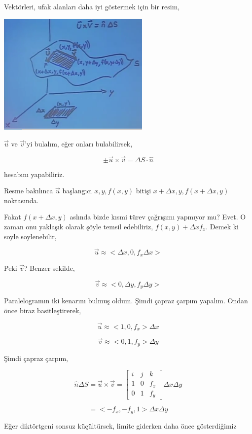 \documentclass[12pt,fleqn]{article}\usepackage{../../common}
\begin{document}
Vektörleri, ufak alanları daha iyi göstermek için bir resim,

\includegraphics[width=20em]{calc_multi_28_03.png}

$\vec{u}$ ve $\vec{v}$'yi bulalım, eğer onları bulabilirsek,

$$
\pm \vec{u} \times \vec{v} = \Delta S \cdot \hat{n}
$$

hesabını yapabiliriz.

Resme bakılınca $\vec{u}$ başlangıcı $x,y,f(x,y)$ bitişi $x+\Delta
x,y,f(x+\Delta x,y)$ noktasında.

Fakat $f(x+\Delta x,y)$ aslında bizde kısmi türev çağrışımı yapmıyor mu?
Evet. O zaman onu yaklaşık olarak şöyle temsil edebiliriz,
$f(x,y) + \Delta x f_x$. Demek ki soyle soylenebilir,

$$
\vec{u} \approx < \Delta x, 0, f_x \Delta x >
$$

Peki $\vec{v}$? Benzer sekilde,

$$
\vec{v} \approx < 0, \Delta y, f_y \Delta y >
$$

Paralelogramın iki kenarını bulmuş oldum. Şimdi çapraz çarpım yapalım. Ondan
önce biraz basitleştirerek,

$$
\vec{u} \approx < 1, 0, f_x  > \Delta x
$$

$$
\vec{v} \approx < 0, 1, f_y  > \Delta y
$$

Şimdi çapraz çarpım,

$$
\hat{n} \Delta S =
\vec{u} \times \vec{v} =
\left[\begin{array}{ccc}
i & j & k \\
1 & 0 & f_x \\
0 & 1 & f_y
\end{array}\right]
\Delta x \Delta y
$$

$$
= < -f_x, -f_y, 1 > \Delta x \Delta y
$$

Eğer diktörtgeni sonsuz küçültürsek, limite giderken daha önce gösterdiğimiz
\end{document}
